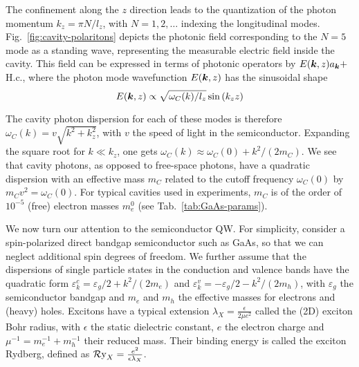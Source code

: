 The confinement along the $z$ direction leads to the quantization of
the photon momentum $k_z = \pi N/l_z$, with $N = 1,2,\dots$ indexing
the longitudinal modes. Fig.~\ref{fig:cavity-polaritons} depicts the
photonic field corresponding to the $N = 5$ mode as a standing wave,
representing the measurable electric field inside the cavity. This
field can be expressed in terms of photonic operators by
$E(\bm{k},z)a_{\bm{k}} +$ H.c., where the photon mode wavefunction
$E(\bm{k},z)$ has the sinusoidal shape~\cite{Carusotto_2013}
%
\begin{equation}\label{eq:electric-field}
  E(\bm{k},z) \propto \sqrt{\omega_C(k)/l_z} \sin \left(k_z z\right)
\end{equation}
% 


The cavity photon dispersion for each of these modes is therefore
$\omega_C(k) = v \sqrt{k^2 + k_z^2}$, with $v$ the speed of light in
the semiconductor. Expanding the square root for $k \ll k_z$, one gets
$\omega_C(k) \approx \omega_C(0) + k^2/(2m_{C})$. We see that cavity
photons, as opposed to free-space photons, have a quadratic dispersion
with an effective mass $m_C$ related to the cutoff frequency $\omega_C(0)$
by $m_{C} v^2 = \omega_C(0)$. For typical cavities used in
experiments, $m_{C}$ is of the order of $10^{-5}$ (free) electron
masses $m_e^0$ (see Tab.~\ref{tab:GaAs-params}).

We now turn our attention to the semiconductor QW. For simplicity,
consider a spin-polarized direct bandgap semiconductor such as GaAs,
so that we can neglect additional spin degrees of freedom. We further
assume that the dispersions of single particle states in the
conduction and valence bands have the quadratic form
$\varepsilon^c_{k} = \varepsilon_g/2 + k^2/(2m_e)$ and
$\varepsilon^v_{k} = - \varepsilon_g/2 - k^2/(2m_h)$, with
$\varepsilon_g$ the semiconductor bandgap and $m_e$ and $m_h$ the
effective masses for electrons and (heavy) holes. Excitons have a
typical extension $\lambda_X = \frac{\epsilon}{2\mu e^2}$ called the
(2D) exciton Bohr radius, with $\epsilon$ the static dielectric
constant, $e$ the electron charge and $\mu^{-1} = m_e^{-1} + m_h^{-1}$
their reduced mass. Their binding energy is called the exciton
Rydberg, defined as $\operatorname{\mathcal{R}y}_X = \frac{e^2}{\epsilon \lambda_X}$.


